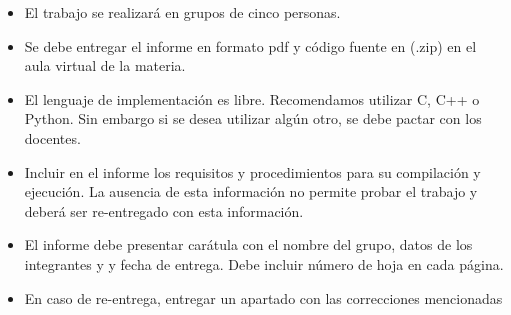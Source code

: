 
\begin{itemize}
    \item El trabajo se realizará en grupos de cinco personas.
    \item Se debe entregar el informe en formato pdf y código fuente en (.zip) en el aula virtual de la materia.
    \item El lenguaje de implementación es libre. Recomendamos utilizar C, C++ o Python. Sin embargo si se desea utilizar algún otro, se debe pactar con los docentes.
    \item Incluir en el informe los requisitos y procedimientos para su compilación y ejecución. La ausencia de esta información no permite probar el trabajo y deberá ser re-entregado con esta información.
    \item El informe debe presentar carátula con el nombre del grupo, datos de los integrantes y y fecha de entrega. Debe incluir número de hoja en cada página.
    \item En caso de re-entrega, entregar un apartado con las correcciones mencionadas
\end{itemize}
